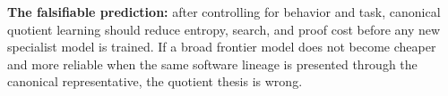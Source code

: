 \textbf{The falsifiable prediction:} after controlling for behavior and task, canonical quotient learning should reduce entropy, search, and proof cost before any new specialist model is trained. If a broad frontier model does not become cheaper and more reliable when the same software lineage is presented through the canonical representative, the quotient thesis is wrong.

